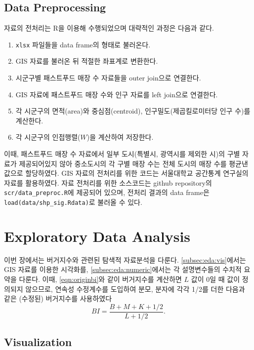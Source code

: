 \documentclass{scrartcl}
\begin{document}
\subsection{Data Preprocessing}\label{subsec:data:preproc}

자료의 전처리는 R을 이용해 수행되었으며 대략적인 과정은 다음과 같다. 
\begin{enumerate}
    \item \texttt{xlsx} 파일들을 data frame의 형태로 불러온다.
    \item GIS 자료를 불러온 뒤 적절한 좌표계로 변환한다.
    \item 시군구별 패스트푸드 매장 수 자료들을 outer join으로 연결한다.
    \item GIS 자료에 패스트푸드 매장 수와 인구 자료를 left join으로 연결한다. 
    \item 각 시군구의 면적(area)와 중심점(centroid), 인구밀도(제곱킬로미터당 인구 수)를 계산한다.
    \item 각 시군구의 인접행렬($W$)을 계산하여 저장한다.
\end{enumerate}

이때, 패스트푸드 매장 수 자료에서 일부 도시(특별시, 광역시를 제외한 시)의 구별 자료가 제공되어있지 않아 중소도시의 각 구별 매장 수는 전체 도시의 매장 수를 평균낸 값으로 할당하였다. GIS 자료의 전처리를 위한 코드는 서울대학교 공간통계 연구실의 자료를 활용하였다. 자료 전처리를 위한 소스코드는 github repository의 \texttt{scr/data\_preproc.R}에 제공되어 있으며, 전처리 결과의 data frame은 \texttt{load(data/shp\_sig.Rdata)}로 불러올 수 있다.

\section{Exploratory Data Analysis}\label{sec:eda}

이번 장에서는 버거지수와 관련된 탐색적 자료분석을 다룬다. \autoref{subsec:eda:vis}에서는 GIS 자료를 이용한 시각화를, \autoref{subsec:eda:numeric}에서는 각 설명변수들의 수치적 요약을 다룬다. 이때, \autoref{eqn:originbi}와 같이 버거지수를 계산하면 $L$ 값이 0일 때 값이 정의되지 않으므로, 연속성 수정계수를 도입하여 분모, 분자에 각각 1/2를 더한 다음과 같은 (수정된) 버거지수를 사용하였다
\begin{equation}\label{eqn:bi}
    BI = \frac{B+M+K+1/2}{L+1/2}.
\end{equation}

\subsection{Visualization}\label{subsec:eda:vis}
\end{document}

